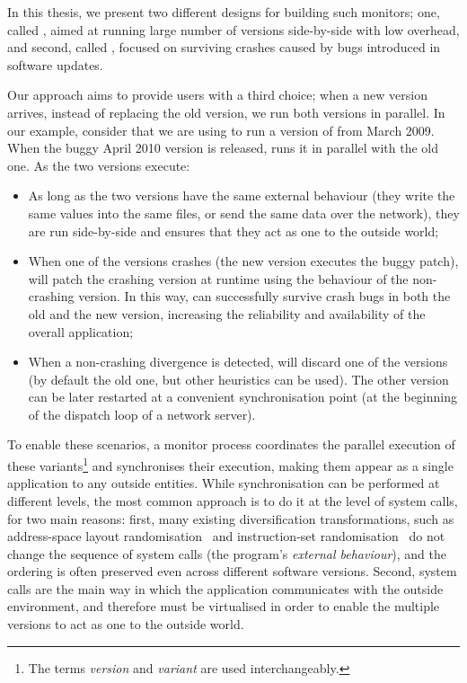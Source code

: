 In this thesis, we present two different designs for building such monitors;
one, called \varan, aimed at running large number of versions side-by-side with
low overhead, and second, called \mx, focused on surviving crashes caused by
bugs introduced in software updates.


Our approach aims to provide users with a third choice; when a new version
arrives, instead of replacing the old version, we run both versions in
parallel. In our example, consider that we are using \mx to run a
version of \lighttpd from March 2009.  When the buggy April 2010 version
is released, \mx runs it in parallel with the old one.  As the two
versions execute:

\begin{itemize}
\item As long as the two versions have the same external behaviour (\eg they
  write the same values into the same files, or send the same data over the
  network), they are run side-by-side and \mx ensures that they act as one to
  the outside world;

\item When one of the versions crashes (\eg the new version executes the buggy
  patch), \mx will patch the crashing version at runtime using the behaviour of
  the non-crashing version.  In this way, \mx can successfully survive crash
  bugs in both the old and the new version, increasing the reliability and
  availability of the overall application;

\item When a non-crashing divergence is detected, \mx will discard one of the
  versions (by default the old one, but other heuristics can be used).  The
  other version can be later restarted at a convenient synchronisation point
  (\eg at the beginning of the dispatch loop of a network server).
\end{itemize}

To enable these scenarios, a monitor process coordinates the parallel execution
of these variants\footnote{The terms \textit{version} and \textit{variant} are
used interchangeably.} and synchronises their execution, making them appear as
a single application to any outside entities.  While synchronisation can be
performed at different levels, the most common approach is to do it at the
level of system calls, for two main reasons: first, many existing
diversification transformations, such as address-space layout
randomisation~\cite{diehard06} and instruction-set
randomisation~\cite{instr-set-rand03} do not change the sequence of system
calls (the program's \textit{external behaviour}), and the ordering is often
preserved even across different software versions.  Second, system
calls are the main way in which the application communicates with the outside
environment, and therefore
must be virtualised in order to enable the multiple versions to act as
one to the outside world.

